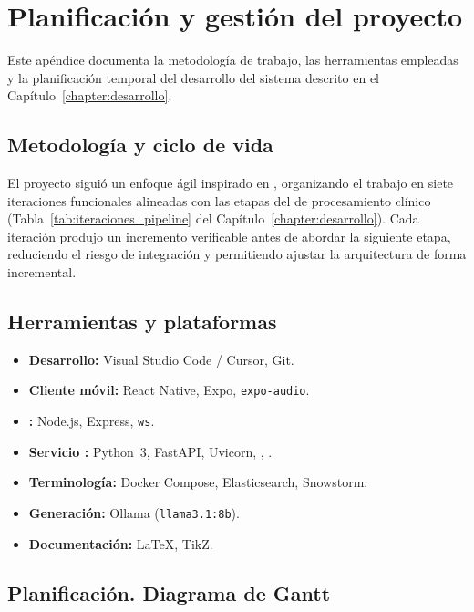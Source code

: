 \chapter{Planificación y gestión del proyecto}\label{appendix:gestion}

Este apéndice documenta la metodología de trabajo, las herramientas empleadas y la planificación
temporal del desarrollo del sistema descrito en el Capítulo~\ref{chapter:desarrollo}.

\section{Metodología y ciclo de vida}\label{section:gestion_metodologia}

El proyecto siguió un enfoque ágil inspirado en , organizando el trabajo en siete
iteraciones funcionales alineadas con las etapas del  de procesamiento clínico
(Tabla~\ref{tab:iteraciones_pipeline} del Capítulo~\ref{chapter:desarrollo}). Cada iteración
produjo un incremento verificable antes de abordar la siguiente etapa, reduciendo el riesgo de
integración y permitiendo ajustar la arquitectura de forma incremental.

\section{Herramientas y plataformas}\label{section:gestion_herramientas}

\begin{itemize}
    \item \textbf{Desarrollo:} Visual Studio Code / Cursor, Git.
    \item \textbf{Cliente móvil:} React Native, Expo, \texttt{expo-audio}.
    \item \textbf{:} Node.js, Express, \texttt{ws}.
    \item \textbf{Servicio :} Python~3, FastAPI, Uvicorn, ,
    .
    \item \textbf{Terminología:} Docker Compose, Elasticsearch, Snowstorm.
    \item \textbf{Generación:} Ollama (\texttt{llama3.1:8b}).
    \item \textbf{Documentación:} \LaTeX, TikZ.
\end{itemize}

\section{Planificación. Diagrama de Gantt}\label{section:gestion_gantt}

